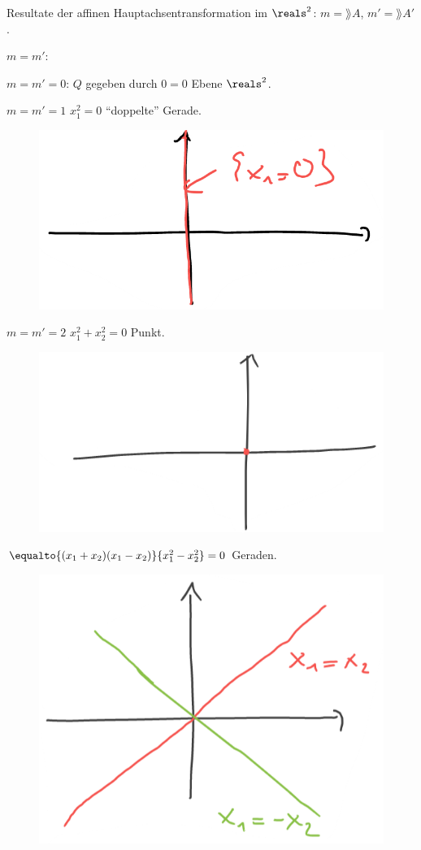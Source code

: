 Resultate der affinen Hauptachsentransformation im \( \reals^2 \): \( m=\rang A \), \( m'=\rang A' \).
\begin{eigenschaftenenumerate}
  \item \( m=m' \):
  \begin{proofdescription}
    \item[\( m=m'=0 \):] \( Q \) gegeben durch \( 0=0 \) \tto Ebene \( \reals^2 \).
    \item[\( m=m'=1 \)] \( x_1^2=0 \) \tto \enquote{doppelte} Gerade. 
    \begin{figure}[H]
      \centering
      \includegraphics[width=0.5\linewidth]{figures/doppelte_gerade}
      \label{fig:doppelte_gerade}
    \end{figure}
    \item[\( m=m'=2 \)] \( x_1^2+x_2^2=0 \) \tto Punkt.
    \begin{figure}[H]
      \centering
      \includegraphics[width=0.5\linewidth]{figures/punkt_quadrik}
      \label{fig:punkt_quadrik}
    \end{figure}
    \item[\( \equalto{(x_1+x_2)(x_1-x_2)}{x_1^2-x_2^2}=0 \)]  Geraden.
    \begin{figure}[H]
      \centering
      \includegraphics[width=0.5\linewidth]{figures/zwei_geraden_quadrik}

\end{figure}
\end{proofdescription}
\end{eigenschaftenenumerate}
